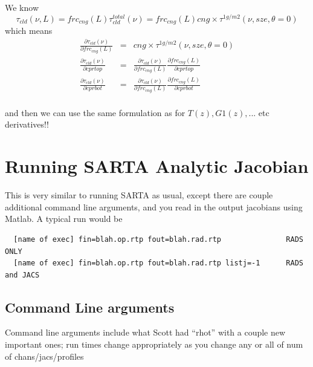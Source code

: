\documentclass[11pt]{article}
\newcommand{\sa}{\textsf{SARTA}\xspace}
\begin{document}
We know 
\[
\tau_{cld}(\nu,L) = frc_{cng}(L) \tau^{total}_{cld}(\nu) =  frc_{cng}(L) cng \times  \tau^{1g/m2}(\nu,sze,\theta = 0)
\]
which means
\begin{eqnarray*}
\frac{\partial \tau_{cld}(\nu)}{\partial frc_{cng}(L)} & = & cng \times  \tau^{1g/m2}(\nu,sze,\theta = 0) \\
\frac{\partial \tau_{cld}(\nu)}{\partial cprtop}       & = & \frac{\partial \tau_{cld}(\nu)}{\partial frc_{cng}(L)} \frac{\partial frc_{cng}(L)}{\partial cprtop} \\
\frac{\partial \tau_{cld}(\nu)}{\partial cprbot}       & = & \frac{\partial \tau_{cld}(\nu)}{\partial frc_{cng}(L)} \frac{\partial frc_{cng}(L)}{\partial cprbot} \\
\end{eqnarray*}

and then we can use the same formulation as for $T(z),G1(z),...$ etc
derivatives!! 

\section{Running SARTA Analytic Jacobian}

This is very similar to running \sa as usual, except there are couple
additional command line arguments, and you read in the output
jacobians using Matlab. A typical run would be \newline

\begin{verbatim}
  [name of exec] fin=blah.op.rtp fout=blah.rad.rtp               RADS ONLY
  [name of exec] fin=blah.op.rtp fout=blah.rad.rtp listj=-1      RADS and JACS
\end{verbatim}

\subsection{Command Line arguments}

Command line arguments include what Scott had \eg ``rhot'' with a
couple new important ones; run times change appropriately as you
change any or all of num of chans/jacs/profiles
\end{document}
